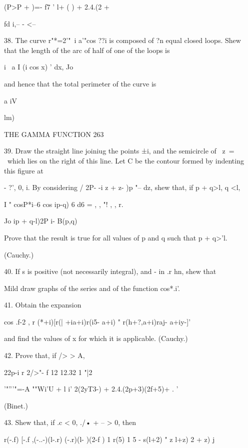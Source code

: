  (P>P +  )=- f7 ' l+ ( ) + 2.4.(2  + 



fd i,-- - <-- 



38. The curve r"*=2'"~i a'"cos ??i  is composed of ?n equal closed loops. Shew that 
the length of the arc of half of one of the loops is 



i~  a I (i cos x) '  dx, 
Jo 



and hence that the total perimeter of the curve is 



a iV 



lm)\ 






THE GAMMA FUNCTION 263 

39. Draw the straight line joiniug the points ±i, and the semicircle of \ z\ = \ which 
lies on the right of this line. Let C be the contour formed by indenting this figure at 

- ?', 0, i. By considering / 2P- -i  z + z- )p   "-- dz, shew that, if p + q>l, q <l, 

I " cosP*i--6 cos ip-q) 6 d6 = , ,    "!  ,  , r. 

Jo   ip + q-l)2P i- B(p,q) 

Prove that the result is true for all values of p and q such that p + q>'l. 

(Cauchy.) 

40. If s is positive (not necessarily integral), and - in  .r  hn, shew that 

Mild draw graphs of the series and of the function cos*.i'. 

41. Obtain the expansion 

cos .f-2 , r (*+i)[r(| +ia+i)r(i5- a+i) "  r(h+?,a+i)raj- a+iy-]' 

and find the values of x for which it is applicable. (Cauchy.) 

42. Prove that, if /> > A, 

22p-i r 2/>"- f 12 12.32 1 "|2 

'"'''"=-A ""Wi'U + l i' 2(2yT3-) + 2.4.(2p+3)(2f+5)+   . ' 

(Binet.) 

43. Shew that, if .c < 0, ./• + -- > 0, then 

r(-.f) [-.f ,(-..-)(l-.r) (-.r)(l- )(2-f ) 1 
r(5) 1 5   - s(l+2) "  z l+z) 2 + z)      j 


